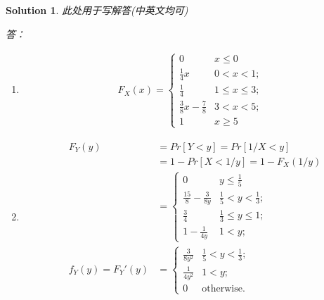 \documentclass[a4paper,UTF8]{article}
\numberwithin{equation}{section}
\newtheorem*{mySol}{Solution}
\begin{document}
\begin{mySol}
此处用于写解答(中英文均可)

答：
\begin{enumerate}[ {(}1{)}]
\item 
\begin{eqnarray*}
	F_X(x) = 
	\begin{cases}
		0				& x \leq 0 \\
		\frac{1}{4} x 	& 0<x<1;\\
		\frac{1}{4} 	& 1 \leq x \leq 3;\\
		\frac{3}{8} x - \frac{7}{8} & 3<x<5;\\
		1				& x \geq 5 
	\end{cases}
\end{eqnarray*}

\item 
\begin{eqnarray*}
	&F_Y(y)&=Pr[Y<y]=Pr[1/X<y]\\
	&&=1-Pr[X<1/y]=1-F_X(1/y)\\
	&&=
	\begin{cases}
		0				& y \leq \frac{1}{5} \\
		\frac{15}{8}-\frac{3}{8y} &\frac{1}{5}<y<\frac{1}{3};\\
		\frac{3}{4} 	& \frac{1}{3} \leq y \leq 1;\\
		1 - \frac{1}{4y} & 1<y;
	\end{cases}
	\\
	&f_Y(y) = F_Y'(y) &= 
	\begin{cases}
		\frac{3}{8y^2} & \frac{1}{5}<y<\frac{1}{3};\\
		\frac{1}{4y^2} & 1<y;\\
		0					& \mbox{otherwise.}
	\end{cases}
\end{eqnarray*}


\end{enumerate}
\end{mySol}
\end{document}
